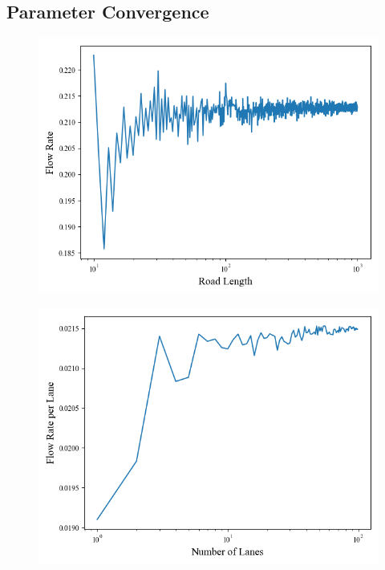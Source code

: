 \documentclass{article}
\begin{document}
\subsection{Parameter Convergence}
\begin{figure}[H]
    \centering
    \begin{minipage}{.5\textwidth}
        \centering
        \includegraphics[width=1.\linewidth]{road.png}
        \begin{minipage}{0.8\textwidth}
            \label{fig:road_length}
        \end{minipage}
    \end{minipage}\hfill
    \begin{minipage}{.5\textwidth}
        \centering
        \includegraphics[width=1.\linewidth]{lanes.png}
        \begin{minipage}{0.8\textwidth}
            \label{fig:lane_count}
        \end{minipage}
    \end{minipage}
\end{figure}
\end{document}
